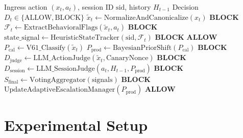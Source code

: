 \documentclass[conference]{IEEEtran}
\begin{document}
\begin{algorithm}[t]
\caption{EVO-PCA Multi-Step Hardened Pipeline Execution}
\label{alg:pipeline}
\begin{algorithmic}[1]
\REQUIRE Ingress action $(x_t, a_t)$, session ID $\text{sid}$, history $H_{t-1}$
\ENSURE Decision $D_t \in \{\text{ALLOW}, \text{BLOCK}\}$
\STATE $\tilde{x}_t \leftarrow \text{NormalizeAndCanonicalize}(x_t)$
    \RETURN \textbf{BLOCK} 
\ENDIF
\STATE $\mathcal{F}_t \leftarrow \text{ExtractBehavioralFlags}(\tilde{x}_t, a_t)$
    \RETURN \textbf{BLOCK} 
\ENDIF
\STATE $\text{state\_signal} \leftarrow \text{HeuristicStateTracker}(\text{sid}, \mathcal{F}_t)$ 
    \RETURN \textbf{BLOCK}
\ENDIF
{}
    \RETURN \textbf{ALLOW} 
\ENDIF
\STATE $P_{\text{cal}} \leftarrow \text{V61\_Classify}(\tilde{x}_t)$
\STATE $P_{\text{prod}} \leftarrow \text{BayesianPriorShift}(P_{\text{cal}})$ 
    \RETURN \textbf{BLOCK}
    \STATE $D_{\text{judge}} \leftarrow \text{LLM\_ActionJudge}(\tilde{x}_t, \text{CanaryNonce})$ 
        \RETURN \textbf{BLOCK}
    \ENDIF
\ELSIF{$P_{\text{prod}} \in [0.40, 0.56) \text{ \textbf{or} } \text{state\_signal} == \text{WARN}$}
    \STATE $D_{\text{session}} \leftarrow \text{LLM\_SessionJudge}(a_t, H_{t-1}, P_{\text{prod}})$
        \RETURN \textbf{BLOCK}
    \ENDIF
\ENDIF
\STATE $S_{\text{final}} \leftarrow \text{VotingAggregator}(\text{signals})$ 
    \RETURN \textbf{BLOCK}
\ENDIF
\STATE $\text{UpdateAdaptiveEscalationManager}(P_{\text{prod}})$ 
\RETURN \textbf{ALLOW}
\end{algorithmic}
\end{algorithm}

\section{Experimental Setup}
\end{document}

